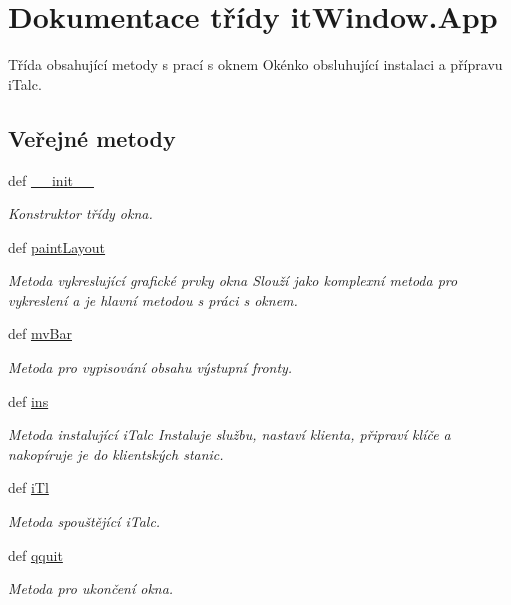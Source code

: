 \hypertarget{classitWindow_1_1App}{\section{Dokumentace třídy it\-Window.\-App}
\label{da/dc1/classitWindow_1_1App}
}


Třída obsahující metody s prací s oknem Okénko obsluhující instalaci a přípravu i\-Talc.  


\subsection*{Veřejné metody}
\begin{DoxyCompactItemize}
\item 
def \hyperlink{classitWindow_1_1App_a358ea0d385b15780fd9967398f16179a}{\-\_\-\-\_\-init\-\_\-\-\_\-}
\begin{DoxyCompactList}\small\item\em Konstruktor třídy okna. \end{DoxyCompactList}\item 
def \hyperlink{classitWindow_1_1App_a4b85fcf604eb62e56ab1419c5d9c9658}{paint\-Layout}
\begin{DoxyCompactList}\small\item\em Metoda vykreslující grafické prvky okna Slouží jako komplexní metoda pro vykreslení a je hlavní metodou s práci s oknem. \end{DoxyCompactList}\item 
def \hyperlink{classitWindow_1_1App_ae3e1bcda10d1e008a01bff04f8b65fcd}{mv\-Bar}
\begin{DoxyCompactList}\small\item\em Metoda pro vypisování obsahu výstupní fronty. \end{DoxyCompactList}\item 
def \hyperlink{classitWindow_1_1App_a43d0be6dbdd9986f4a412e3856c4db16}{ins}
\begin{DoxyCompactList}\small\item\em Metoda instalující i\-Talc Instaluje službu, nastaví klienta, připraví klíče a nakopíruje je do klientských stanic. \end{DoxyCompactList}\item 
def \hyperlink{classitWindow_1_1App_ad1fd8fe169b638114c7763ff46965d9e}{i\-Tl}
\begin{DoxyCompactList}\small\item\em Metoda spouštějící i\-Talc. \end{DoxyCompactList}\item 
def \hyperlink{classitWindow_1_1App_a8158d651d179afcacc028088642e297b}{qquit}
\begin{DoxyCompactList}\small\item\em Metoda pro ukončení okna. \end{DoxyCompactList}\end{DoxyCompactItemize}
